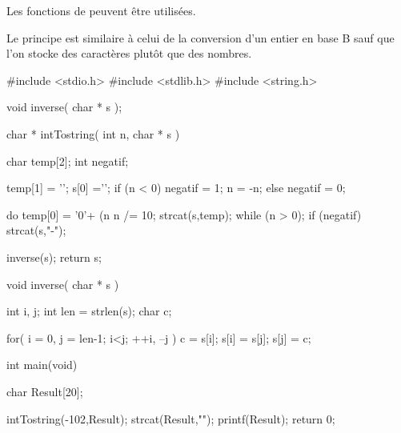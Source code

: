 Les fonctions de  peuvent être utilisées.

\begin{correction}Le principe est similaire à celui de la conversion d'un entier en base B sauf que l'on stocke des caractères plutôt que des nombres.\end{correction}
\begin{csourcecorrection}
#include <stdio.h>
#include <stdlib.h>
#include <string.h>

void inverse( char * s );

char * intTostring( int n, char * s )
{
  char temp[2];
  int negatif;

  temp[1] = '\0';
  s[0] ='\0';
  if (n < 0)
  {
    negatif = 1;
    n = -n;
  }
  else
    negatif = 0;

  do
  {
    temp[0] = '0'+ (n %
    n /= 10;
    strcat(s,temp);
  }
  while (n > 0);
  if (negatif)
    strcat(s,"-");

  inverse(s);
  return s;
}

void inverse( char * s )
{
  int i, j;
  int len = strlen(s);
  char c;

  for( i = 0, j = len-1; i<j; ++i, --j )
  {
    c = s[i];
    s[i] = s[j];
    s[j] = c;
  }
}

int main(void)
{
  char Result[20];

  intTostring(-102,Result);
  strcat(Result,"\n");
  printf(Result);
  return 0;
}
\end{csourcecorrection}

